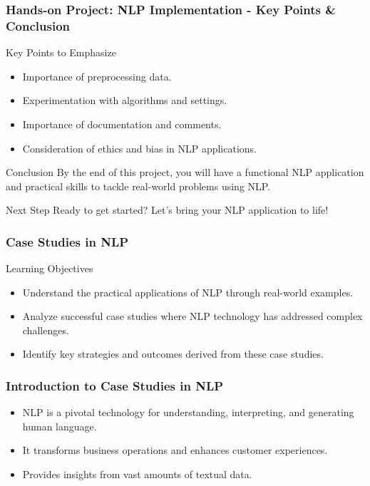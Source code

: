 \documentclass[aspectratio=169]{beamer}
\begin{document}
\begin{frame}[fragile]
    \frametitle{Hands-on Project: NLP Implementation - Key Points & Conclusion}
    \begin{block}{Key Points to Emphasize}
        \begin{itemize}
            \item Importance of preprocessing data.
            \item Experimentation with algorithms and settings.
            \item Importance of documentation and comments.
            \item Consideration of ethics and bias in NLP applications.
        \end{itemize}
    \end{block}
    \begin{block}{Conclusion}
        By the end of this project, you will have a functional NLP application and practical skills to tackle real-world problems using NLP.
    \end{block}
    \begin{block}{Next Step}
        Ready to get started? Let's bring your NLP application to life!
    \end{block}
\end{frame}

\begin{frame}
    \frametitle{Case Studies in NLP}
    \begin{block}{Learning Objectives}
        \begin{itemize}
            \item Understand the practical applications of NLP through real-world examples.
            \item Analyze successful case studies where NLP technology has addressed complex challenges.
            \item Identify key strategies and outcomes derived from these case studies.
        \end{itemize}
    \end{block}
\end{frame}

\begin{frame}
    \frametitle{Introduction to Case Studies in NLP}
    \begin{itemize}
        \item NLP is a pivotal technology for understanding, interpreting, and generating human language.
        \item It transforms business operations and enhances customer experiences.
        \item Provides insights from vast amounts of textual data.
    \end{itemize}
\end{frame}
\end{document}

